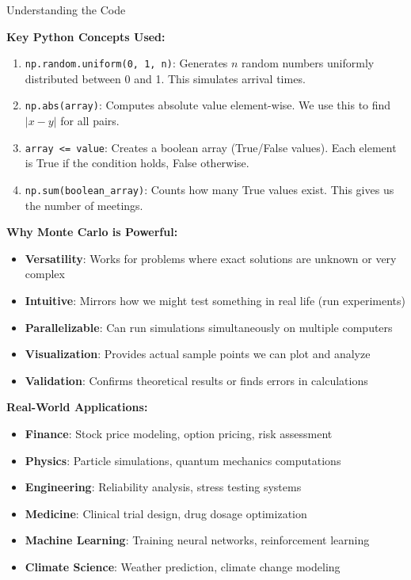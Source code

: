 \begin{keyconceptboxbreak}{Understanding the Code}

\textbf{Key Python Concepts Used:}

\begin{enumerate}
    \item \texttt{np.random.uniform(0, 1, n)}: Generates $n$ random numbers uniformly distributed between 0 and 1. This simulates arrival times.

    \item \texttt{np.abs(array)}: Computes absolute value element-wise. We use this to find $|x - y|$ for all pairs.

    \item \texttt{array <= value}: Creates a boolean array (True/False values). Each element is True if the condition holds, False otherwise.

    \item \texttt{np.sum(boolean\_array)}: Counts how many True values exist. This gives us the number of meetings.
\end{enumerate}

\textbf{Why Monte Carlo is Powerful:}

\begin{itemize}
    \item \textbf{Versatility}: Works for problems where exact solutions are unknown or very complex
    \item \textbf{Intuitive}: Mirrors how we might test something in real life (run experiments)
    \item \textbf{Parallelizable}: Can run simulations simultaneously on multiple computers
    \item \textbf{Visualization}: Provides actual sample points we can plot and analyze
    \item \textbf{Validation}: Confirms theoretical results or finds errors in calculations
\end{itemize}

\textbf{Real-World Applications:}

\begin{itemize}
    \item \textbf{Finance}: Stock price modeling, option pricing, risk assessment
    \item \textbf{Physics}: Particle simulations, quantum mechanics computations
    \item \textbf{Engineering}: Reliability analysis, stress testing systems
    \item \textbf{Medicine}: Clinical trial design, drug dosage optimization
    \item \textbf{Machine Learning}: Training neural networks, reinforcement learning
    \item \textbf{Climate Science}: Weather prediction, climate change modeling
\end{itemize}


\end{keyconceptboxbreak}
